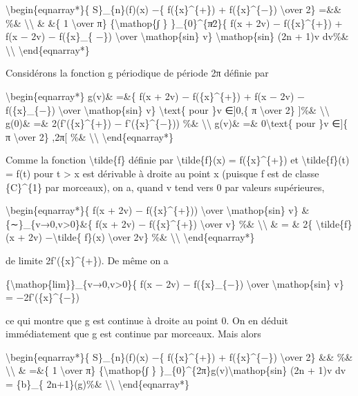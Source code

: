 \documentclass[]{article}
\begin{document}
\textbackslash{}begin\{eqnarray*\}\{ S\}\_\{n\}(f)(x) −\{
f(\{x\}\^{}\{+\}) + f(\{x\}\^{}\{−\}) \textbackslash{}over 2\} =\&\&
\%\& \textbackslash{}\textbackslash{} \& \&\{ 1 \textbackslash{}over π\}
\{\textbackslash{}mathop\{∫ \} \}\_\{0\}\^{}\{π∕2\}\{ f(x + 2v) −
f(\{x\}\^{}\{+\}) + f(x − 2v) − f(\{x\}\_\{ −\}) \textbackslash{}over
\textbackslash{}mathop\{sin\} v\} \textbackslash{}mathop\{sin\} (2n +
1)v dv\%\& \textbackslash{}\textbackslash{}
\textbackslash{}end\{eqnarray*\}

Considérons la fonction g périodique de période 2π définie par

\textbackslash{}begin\{eqnarray*\} g(v)\& =\&\{ f(x + 2v) −
f(\{x\}\^{}\{+\}) + f(x − 2v) − f(\{x\}\_\{−\}) \textbackslash{}over
\textbackslash{}mathop\{sin\} v\} \textbackslash{}text\{ pour \}v
∈{]}0,\{ π \textbackslash{}over 2\} {]}\%\&
\textbackslash{}\textbackslash{} g(0)\& =\& 2(f'(\{x\}\^{}\{+\}) −
f'(\{x\}\^{}\{−\})) \%\& \textbackslash{}\textbackslash{} g(v)\& =\&
0\textbackslash{}text\{ pour \}v ∈{]}\{ π \textbackslash{}over 2\}
,2π{[} \%\& \textbackslash{}\textbackslash{}
\textbackslash{}end\{eqnarray*\}

Comme la fonction \textbackslash{}tilde\{f\} définie par
\textbackslash{}tilde\{f\}(x) = f(\{x\}\^{}\{+\}) et
\textbackslash{}tilde\{f\}(t) = f(t) pour t \textgreater{} x est
dérivable à droite au point x (puisque f est de classe \{C\}\^{}\{1\}
par morceaux), on a, quand v tend vers 0 par valeurs supérieures,

\textbackslash{}begin\{eqnarray*\}\{ f(x + 2v) − f(\{x\}\^{}\{+\}))
\textbackslash{}over \textbackslash{}mathop\{sin\} v\} \&
\{∼\}\_\{v→0,v\textgreater{}0\}\&\{ f(x + 2v) − f(\{x\}\^{}\{+\})
\textbackslash{}over v\} \%\& \textbackslash{}\textbackslash{} \& = \&
2\{ \textbackslash{}tilde\{f\}(x + 2v) −\textbackslash{}tilde\{ f\}(x)
\textbackslash{}over 2v\} \%\& \textbackslash{}\textbackslash{}
\textbackslash{}end\{eqnarray*\}

de limite 2f'(\{x\}\^{}\{+\}). De même on a

\{\textbackslash{}mathop\{lim\}\}\_\{v→0,v\textgreater{}0\}\{ f(x − 2v)
− f(\{x\}\_\{−\}) \textbackslash{}over \textbackslash{}mathop\{sin\} v\}
= −2f'(\{x\}\^{}\{−\})

ce qui montre que g est continue à droite au point 0. On en déduit
immédiatement que g est continue par morceaux. Mais alors

\textbackslash{}begin\{eqnarray*\}\{ S\}\_\{n\}(f)(x) −\{
f(\{x\}\^{}\{+\}) + f(\{x\}\^{}\{−\}) \textbackslash{}over 2\} \&\& \%\&
\textbackslash{}\textbackslash{} \& =\&\{ 1 \textbackslash{}over π\}
\{\textbackslash{}mathop\{∫ \}
\}\_\{0\}\^{}\{2π\}g(v)\textbackslash{}mathop\{sin\} (2n + 1)v dv =
\{b\}\_\{ 2n+1\}(g)\%\& \textbackslash{}\textbackslash{}
\textbackslash{}end\{eqnarray*\}
\end{document}
